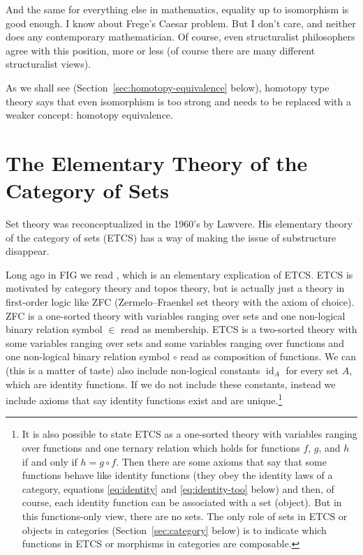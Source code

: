 \documentclass[11pt]{article}
\DeclareMathOperator{\idfun}{id}
\begin{document}
And the same for everything else in mathematics, equality up to isomorphism
is good enough.
I know about Frege's Caesar problem.  But I don't care, and neither does
any contemporary mathematician.
Of course, even structuralist philosophers agree with this position, more
or less (of course there are many different structuralist views).

As we shall see (Section~\ref{sec:homotopy-equivalence} below),
homotopy type theory says that even isomorphism is too strong and
needs to be replaced with a weaker concept: homotopy equivalence.

\section{The Elementary Theory of the Category of Sets}

Set theory was reconceptualized in the 1960's by
Lawvere.  His elementary theory of the category of sets (ETCS)
\citep{lawvere-etcs}
has a way of making the issue of substructure disappear.

Long ago in FIG we read \citet{leinster}, which is an elementary
explication of ETCS.  ETCS is motivated by category theory and topos theory,
but is actually just a theory in first-order logic like ZFC
(Zermelo–Fraenkel set theory with the axiom of choice).  ZFC is a one-sorted
theory with variables ranging over sets and one non-logical binary relation
symbol $\in$ read as membership.
ETCS is a two-sorted
theory with some variables ranging over sets and some variables ranging over
functions and one non-logical binary relation
symbol $\circ$ read as composition of functions.
We can (this is a matter of taste) also include non-logical constants
$\idfun_A$ for every set $A$, which are identity functions.
If we do not include these constants,
instead we include axioms that say identity functions exist and
are unique.\footnote{It is also possible to state ETCS as a one-sorted
theory with variables ranging over functions and one ternary relation
which holds for functions $f$, $g$, and $h$ if and only if $h = g \circ f$.
Then there are some axioms that
say that some functions behave like identity functions (they obey the identity
laws of a category, equations \eqref{eq:identity} and \eqref{eq:identity-too}
below) and then, of course, each identity function can be associated with
a set (object).  But in this functions-only view, there are no sets.  The
only role of sets in ETCS or objects in categories (Section~\ref{sec:category}
below) is to indicate which functions in ETCS or morphisms in categories
are composable.\label{foot:arrows-only}}
\end{document}
